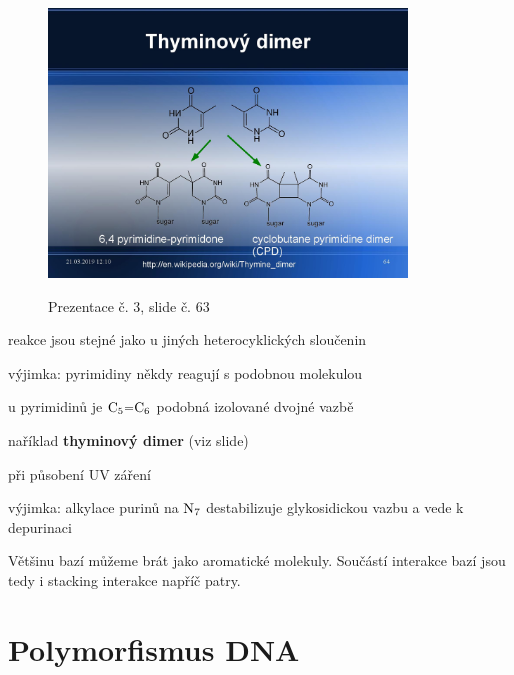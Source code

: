 \documentclass[DIV=8]{scrreprt}
\begin{document}
\begin{figure}
    \caption{Prezentace č. 3, slide č. 63}
    \includegraphics[width=0.85\textwidth]{slides-3/slide-63.jpg}
    \centering
    \label{slides-3-slide-63}
\end{figure}

\begin{myItemize}[nosep]
    \item reakce jsou stejné jako u jiných heterocyklických sloučenin
    \item výjimka: pyrimidiny někdy reagují s podobnou molekulou
\begin{myItemize}[nosep]
    \item u pyrimidinů je \(\ce{C5=C6}\) podobná izolované dvojné vazbě
    \item naříklad \textbf{thyminový dimer} (viz slide)
    \item při působení UV záření
\end{myItemize}

    \item výjimka: alkylace purinů na \(\ce{N7}\) destabilizuje glykosidickou vazbu a vede k depurinaci
\end{myItemize}



Většinu bazí můžeme brát jako aromatické molekuly. Součástí interakce bazí jsou tedy i stacking interakce napříč patry.

\chapter{Polymorfismus DNA} \label{Polymorfismus DNA}


\end{document}
